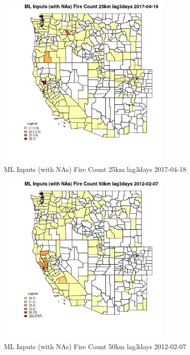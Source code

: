 \begin{figure} 
\centering  
\includegraphics[width=0.77\textwidth]{Code_Outputs/Report_ML_input_PM25_Step4_part_f_de_duplicated_aveswNAs_CountyFire_Count_25km_lag3daysMean2017-04-18.jpg} 
\caption{\label{fig:Report_ML_input_PM25_Step4_part_f_de_duplicated_aveswNAsCountyFire_Count_25km_lag3daysMean2017-04-18}ML Inputs (with NAs) Fire Count 25km lag3days 2017-04-18} 
\end{figure} 
 

\begin{figure} 
\centering  
\includegraphics[width=0.77\textwidth]{Code_Outputs/Report_ML_input_PM25_Step4_part_f_de_duplicated_aveswNAs_CountyFire_Count_50km_lag3daysMean2012-02-07.jpg} 
\caption{\label{fig:Report_ML_input_PM25_Step4_part_f_de_duplicated_aveswNAsCountyFire_Count_50km_lag3daysMean2012-02-07}ML Inputs (with NAs) Fire Count 50km lag3days 2012-02-07} 
\end{figure} 
 

